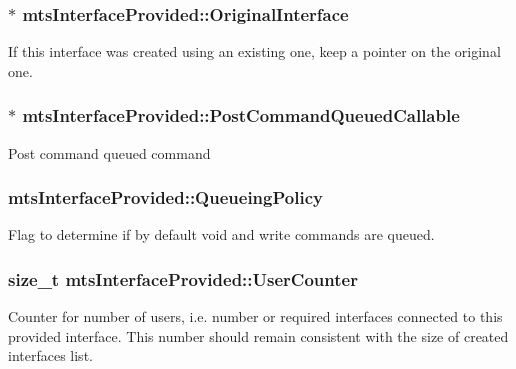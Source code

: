 \subsubsection[{Original\+Interface}]{$\ast$ mts\+Interface\+Provided\+::\+Original\+Interface\hspace{0.3cm}{\ttfamily [protected]}}\label{classmts_interface_provided_aa3c7fd4efc804d522edf06f02aaf646e}
If this interface was created using an existing one, keep a pointer on the original one. \hypertarget{classmts_interface_provided_af7e4e42c17eea4b0a71fa7650a34a120}{}
\subsubsection[{Post\+Command\+Queued\+Callable}]{$\ast$ mts\+Interface\+Provided\+::\+Post\+Command\+Queued\+Callable\hspace{0.3cm}{\ttfamily [protected]}}\label{classmts_interface_provided_af7e4e42c17eea4b0a71fa7650a34a120}
Post command queued command \hypertarget{classmts_interface_provided_aa46d6cd890786ba31c40c8e7882fc9a3}{}
\subsubsection[{Queueing\+Policy}]{ mts\+Interface\+Provided\+::\+Queueing\+Policy\hspace{0.3cm}{\ttfamily [protected]}}\label{classmts_interface_provided_aa46d6cd890786ba31c40c8e7882fc9a3}
Flag to determine if by default void and write commands are queued. \hypertarget{classmts_interface_provided_a6a475bd79ec48c9db26b25c7d4e0a40f}{}
\subsubsection[{User\+Counter}]{\setlength{\rightskip}{0pt plus 5cm}size\+\_\+t mts\+Interface\+Provided\+::\+User\+Counter\hspace{0.3cm}{\ttfamily [protected]}}\label{classmts_interface_provided_a6a475bd79ec48c9db26b25c7d4e0a40f}
Counter for number of users, i.\+e. number or required interfaces connected to this provided interface. This number should remain consistent with the size of created interfaces list. \hypertarget{classmts_interface_provided_a37bb4e89240cb1056a013d9aa9b1d2aa}{}
